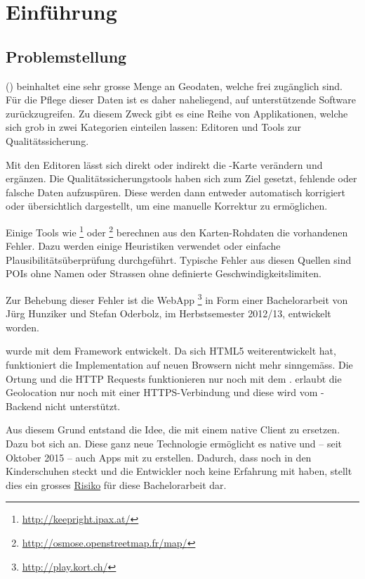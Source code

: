 \chapter{Einführung}
\label{tb-einfuehrung}

\section{Problemstellung}
 () beinhaltet eine sehr grosse Menge an Geodaten, welche frei zugänglich sind.
Für die Pflege dieser Daten ist es daher naheliegend, auf unterstützende Software zurückzugreifen.
Zu diesem Zweck gibt es eine Reihe von Applikationen, welche sich grob in zwei Kategorien einteilen lassen:
Editoren und Tools zur Qualitätssicherung.

Mit den Editoren lässt sich direkt oder indirekt die -Karte verändern und ergänzen.
Die Qualitätssicherungstools haben sich zum Ziel gesetzt, fehlende oder falsche Daten aufzuspüren.
Diese werden dann entweder automatisch korrigiert oder übersichtlich dargestellt, um eine manuelle Korrektur zu ermöglichen.

Einige Tools wie \footnote{\url{http://keepright.ipax.at/}} oder \footnote{\url{http://osmose.openstreetmap.fr/map/}} berechnen aus den Karten-Rohdaten die vorhandenen Fehler.
Dazu werden einige Heuristiken verwendet oder einfache Plausibilitätsüberprüfung durchgeführt.
Typische Fehler aus diesen Quellen sind \glspl{POI} ohne Namen oder Strassen ohne definierte Geschwindigkeitslimiten.\cite{ba-kort-2012}

Zur Behebung dieser Fehler ist die \gls{WebApp} \kort{}\footnote{\url{http://play.kort.ch/}} in Form einer Bachelorarbeit von Jürg Hunziker und Stefan Oderbolz, im Herbstsemester 2012/13, entwickelt  worden.\cite{ba-kort-2012}

\kort{} wurde mit dem  \gls{Framework} entwickelt.
Da sich HTML5 weiterentwickelt hat, funktioniert die Implementation auf neuen Browsern nicht mehr sinngemäss.
Die Ortung und die HTTP Requests funktionieren nur noch mit dem .
 erlaubt die Geolocation nur noch mit einer HTTPS-Verbindung und diese wird vom \kort{}-Backend nicht unterstützt.

Aus diesem Grund entstand die Idee, die \kort{} mit einem native Client zu ersetzen.
Dazu bot sich  an. 
Diese ganz neue Technologie ermöglicht es native  und -- seit Oktober 2015 -- auch  Apps mit  zu erstellen. 
Dadurch, dass  noch in den Kinderschuhen steckt und die Entwickler noch keine Erfahrung mit  haben, stellt dies ein grosses \hyperref[pm-projektmanagement-risikomanagement]{Risiko} für diese Bachelorarbeit dar.

